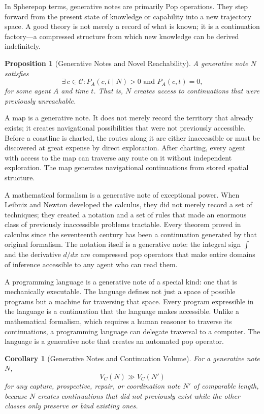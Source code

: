 \documentclass[12pt, a4paper]{article}
\theoremstyle{plain}
\newtheorem{proposition}[theorem]{Proposition}
\newtheorem{corollary}[theorem]{Corollary}
\theoremstyle{definition}
\theoremstyle{remark}
\begin{document}
In Spherepop terms, generative notes are primarily Pop operations. They step
forward from the present state of knowledge or capability into a new trajectory
space. A good theory is not merely a record of what is known; it is a continuation
factory---a compressed structure from which new knowledge can be derived
indefinitely.

\begin{proposition}[Generative Notes and Novel Reachability]
A generative note $N$ satisfies
\[
\exists\, c \in \mathcal{C} : P_A(c, t \mid N) > 0 \text{ and } P_A(c, t) = 0,
\]
for some agent $A$ and time $t$. That is, $N$ creates access to continuations
that were previously unreachable.
\end{proposition}

A map is a generative note. It does not merely record the territory that already
exists; it creates navigational possibilities that were not previously accessible.
Before a coastline is charted, the routes along it are either inaccessible or
must be discovered at great expense by direct exploration. After charting, every
agent with access to the map can traverse any route on it without independent
exploration. The map generates navigational continuations from stored spatial
structure.

A mathematical formalism is a generative note of exceptional power. When Leibniz
and Newton developed the calculus, they did not merely record a set of techniques;
they created a notation and a set of rules that made an enormous class of
previously inaccessible problems tractable. Every theorem proved in calculus
since the seventeenth century has been a continuation generated by that original
formalism. The notation itself is a generative note: the integral sign $\int$ and
the derivative $d/dx$ are compressed pop operators that make entire domains of
inference accessible to any agent who can read them.

A programming language is a generative note of a special kind: one that is
mechanically executable. The language defines not just a space of possible
programs but a machine for traversing that space. Every program expressible in
the language is a continuation that the language makes accessible. Unlike a
mathematical formalism, which requires a human reasoner to traverse its
continuations, a programming language can delegate traversal to a computer. The
language is a generative note that creates an automated pop operator.

\begin{corollary}[Generative Notes and Continuation Volume]
For a generative note $N$,
\[
V_C(N) \gg V_C(N')
\]
for any capture, prospective, repair, or coordination note $N'$ of comparable
length, because $N$ creates continuations that did not previously exist while
the other classes only preserve or bind existing ones.
\end{corollary}
\end{document}

